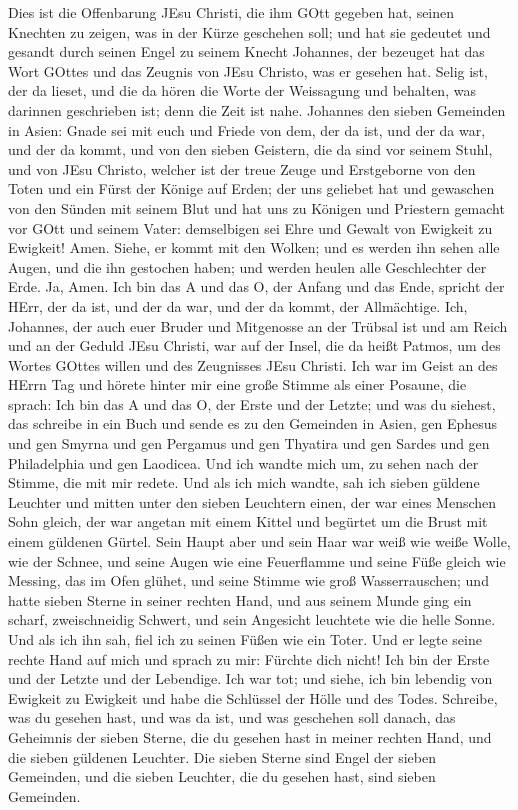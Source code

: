  Dies ist die Offenbarung JEsu Christi, die ihm GOtt gegeben
hat, seinen Knechten zu zeigen, was in der Kürze geschehen soll; und hat
sie gedeutet und gesandt durch seinen Engel zu seinem Knecht Johannes,
 der bezeuget hat das Wort GOttes und das Zeugnis von JEsu
Christo, was er gesehen hat.  Selig ist, der da lieset, und
die da hören die Worte der Weissagung und behalten, was darinnen
geschrieben ist; denn die Zeit ist nahe.  Johannes den
sieben Gemeinden in Asien: Gnade sei mit euch und Friede von dem, der da
ist, und der da war, und der da kommt, und von den sieben Geistern, die
da sind vor seinem Stuhl,  und von JEsu Christo, welcher ist
der treue Zeuge und Erstgeborne von den Toten und ein Fürst der Könige
auf Erden; der uns geliebet hat und gewaschen von den Sünden mit seinem
Blut  und hat uns zu Königen und Priestern gemacht vor GOtt
und seinem Vater: demselbigen sei Ehre und Gewalt von Ewigkeit zu
Ewigkeit! Amen.  Siehe, er kommt mit den Wolken; und es
werden ihn sehen alle Augen, und die ihn gestochen haben; und werden
heulen alle Geschlechter der Erde. Ja, Amen.  Ich bin das A
und das O, der Anfang und das Ende, spricht der HErr, der da ist, und
der da war, und der da kommt, der Allmächtige.  Ich,
Johannes, der auch euer Bruder und Mitgenosse an der Trübsal ist und am
Reich und an der Geduld JEsu Christi, war auf der Insel, die da heißt
Patmos, um des Wortes GOttes willen und des Zeugnisses JEsu Christi.
 Ich war im Geist an des HErrn Tag und hörete hinter mir
eine große Stimme als einer Posaune,  die sprach: Ich bin
das A und das O, der Erste und der Letzte; und was du siehest, das
schreibe in ein Buch und sende es zu den Gemeinden in Asien, gen Ephesus
und gen Smyrna und gen Pergamus und gen Thyatira und gen Sardes und gen
Philadelphia und gen Laodicea.  Und ich wandte mich um, zu
sehen nach der Stimme, die mit mir redete. Und als ich mich wandte, sah
ich sieben güldene Leuchter  und mitten unter den sieben
Leuchtern einen, der war eines Menschen Sohn gleich, der war angetan mit
einem Kittel und begürtet um die Brust mit einem güldenen Gürtel.
 Sein Haupt aber und sein Haar war weiß wie weiße Wolle,
wie der Schnee, und seine Augen wie eine Feuerflamme  und
seine Füße gleich wie Messing, das im Ofen glühet, und seine Stimme wie
groß Wasserrauschen;  und hatte sieben Sterne in seiner
rechten Hand, und aus seinem Munde ging ein scharf, zweischneidig
Schwert, und sein Angesicht leuchtete wie die helle Sonne. 
Und als ich ihn sah, fiel ich zu seinen Füßen wie ein Toter. Und er
legte seine rechte Hand auf mich und sprach zu mir: Fürchte dich nicht!
Ich bin der Erste und der Letzte  und der Lebendige. Ich
war tot; und siehe, ich bin lebendig von Ewigkeit zu Ewigkeit und habe
die Schlüssel der Hölle und des Todes.  Schreibe, was du
gesehen hast, und was da ist, und was geschehen soll danach,
 das Geheimnis der sieben Sterne, die du gesehen hast in
meiner rechten Hand, und die sieben güldenen Leuchter. Die sieben Sterne
sind Engel der sieben Gemeinden, und die sieben Leuchter, die du gesehen
hast, sind sieben Gemeinden.

